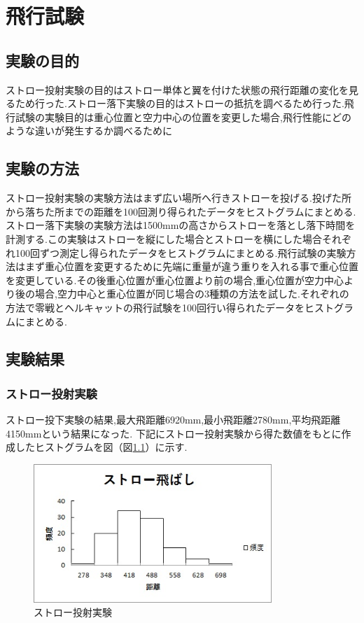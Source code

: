 \chapter{飛行試験}

\section{実験の目的}
ストロー投射実験の目的はストロー単体と翼を付けた状態の飛行距離の変化を見るため行った.ストロー落下実験の目的はストローの抵抗を調べるため行った.飛行試験の実験目的は重心位置と空力中心の位置を変更した場合,飛行性能にどのような違いが発生するか調べるために

\section{実験の方法}
ストロー投射実験の実験方法はまず広い場所へ行きストローを投げる.投げた所から落ちた所までの距離を100回測り得られたデータをヒストグラムにまとめる.ストロー落下実験の実験方法は1500mmの高さからストローを落とし落下時間を計測する.この実験はストローを縦にした場合とストローを横にした場合それぞれ100回ずつ測定し得られたデータをヒストグラムにまとめる.飛行試験の実験方法はまず重心位置を変更するために先端に重量が違う重りを入れる事で重心位置を変更している.その後重心位置が重心位置より前の場合,重心位置が空力中心より後の場合,空力中心と重心位置が同じ場合の3種類の方法を試した.それぞれの方法で零戦とヘルキャットの飛行試験を100回行い得られたデータをヒストグラムにまとめる.

\section{実験結果}

\subsection{ストロー投射実験}
ストロー投下実験の結果,最大飛距離6920mm,最小飛距離2780mm,平均飛距離4150mmという結果になった.
下記にストロー投射実験から得た数値をもとに作成したヒストグラムを図（図\ref{fig:fly}）に示す.

\begin{figure}[htbp]
  \begin{center}
    \includegraphics[width=90mm]{fly.JPG}
    \end{center}
  \caption{ストロー投射実験}
 \label{fig:fly}
\end{figure}

